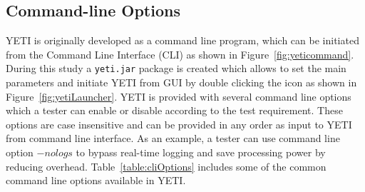 \bigskip
\bigskip

\subsection{Command-line Options}
YETI is originally developed as a command line program, which can be initiated from the Command Line Interface (CLI) as shown in Figure~\ref{fig:yeticommand}. During this study a \verb+yeti.jar+ package is created which allows to set the main parameters and initiate YETI from GUI by double clicking the icon as shown in Figure~\ref{fig:yetiLauncher}. YETI is provided with several command line options which a tester can enable or disable according to the test requirement. These options are case insensitive and can be provided in any order as input to YETI from command line interface. As an example, a tester can use command line option $-nologs$ to bypass real-time logging and save processing power by reducing overhead. Table~\ref{table:cliOptions} includes some of the common command line options available in YETI.

